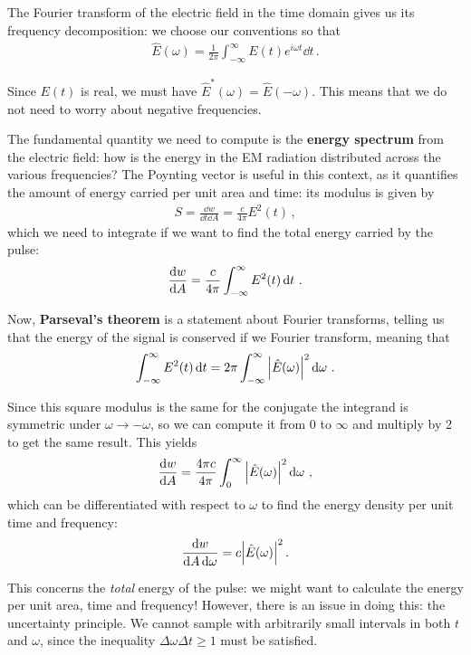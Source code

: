 \documentclass[main.tex]{subfiles}
\begin{document}
The Fourier transform of the electric field in the time domain gives us its frequency decomposition: we choose our conventions so that 
%
\begin{align}
\hat{E}(\omega ) = \frac{1}{2 \pi } \int_{- \infty }^{\infty } E(t) e^{i \omega t} \dd{t} 
\,.
\end{align}

Since \(E(t)\) is real, we must have \(\hat{E}^{*}(\omega ) = \hat{E} (- \omega )\). 
This means that we do not need to worry about negative frequencies. 

The fundamental quantity we need to compute is the \textbf{energy spectrum} from the electric field: how is the energy in the EM radiation distributed across the various frequencies? 
The Poynting vector is useful in this context, as it quantifies the amount of energy carried per unit area and time: its modulus is given by 
%
\begin{align}
S = \frac{ \dd{w}}{ \dd{t} \dd{A}} = \frac{c}{4 \pi } E^2(t)
\,,
\end{align}
%
which we need to integrate if we want to find the total energy carried by the pulse: 
%
\begin{align}
\dv{w}{A} = \frac{c}{4 \pi } \int_{- \infty }^{\infty} E^2(t) \dd{t}
\,.
\end{align}

Now, \textbf{Parseval's theorem} is a statement about Fourier transforms, telling us that the energy of the signal is conserved if we Fourier transform, meaning that 
%
\begin{align}
\int_{- \infty }^{\infty } E^2(t) \dd{t} = 2 \pi \int_{-\infty}^{\infty} \abs{\hat{E}(\omega )}^2 \dd{\omega}
\,.
\end{align}

Since this square modulus is the same for the conjugate the integrand is symmetric under \(\omega \to - \omega \), so we can compute it from 0 to \(\infty \) and multiply by 2 to get the same result. This yields 
%
\begin{align}
\dv{w}{A} = \frac{4 \pi c}{4 \pi } \int_{0}^{\infty }\abs{\hat{E}(\omega )}^2 \dd{\omega}
\,,
\end{align}
%
which can be differentiated with respect to \(\omega \) to find the energy density per unit time and frequency:
%
\begin{align}
\frac{ \dd{w}}{ \dd{A} \dd{\omega }} = c \abs{\hat{E}(\omega )}^2
\,.
\end{align}

This concerns the \emph{total} energy of the pulse: we might want to calculate the energy per unit area, time and frequency! 
However, there is an issue in doing this: the uncertainty principle. We cannot sample with arbitrarily small intervals in both \(t\) and \(\omega \), since the inequality \(\Delta \omega \Delta t \geq 1\) must be satisfied. 
\end{document}
